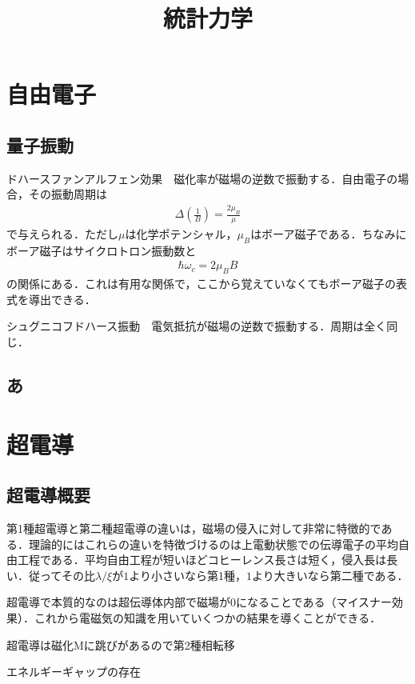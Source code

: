 \documentclass[a4j]{jarticle}
\title{統計力学}
\begin{document}
\maketitle


\section{自由電子}


\subsection{量子振動}
ドハースファンアルフェン効果　磁化率が磁場の逆数で振動する．自由電子の場合，その振動周期は
\begin{align*}
 \Delta \left(\frac{1}{B}\right)=\frac{2\mu_B}{\mu}
\end{align*}
で与えられる．ただし$\mu$は化学ポテンシャル，$\mu_B$はボーア磁子である．ちなみにボーア磁子はサイクロトロン振動数と
\begin{align*}
 \hbar \omega_c=2\mu_BB
\end{align*}
の関係にある．これは有用な関係で，ここから覚えていなくてもボーア磁子の表式を導出できる．


シュグニコフドハース振動　電気抵抗が磁場の逆数で振動する．周期は全く同じ．


\subsection{あ}


\section{超電導}
\subsection{超電導概要}
第1種超電導と第二種超電導の違いは，磁場の侵入に対して非常に特徴的である．理論的にはこれらの違いを特徴づけるのは上電動状態での伝導電子の平均自由工程である．平均自由工程が短いほどコヒーレンス長さは短く，侵入長は長い．従ってその比$\lambda /\xi$が$1$より小さいなら第1種，$1$より大きいなら第二種である．



超電導で本質的なのは超伝導体内部で磁場が$0$になることである（マイスナー効果）．これから電磁気の知識を用いていくつかの結果を導くことができる．

超電導は磁化Mに跳びがあるので第2種相転移

エネルギーギャップの存在
\end{document}
